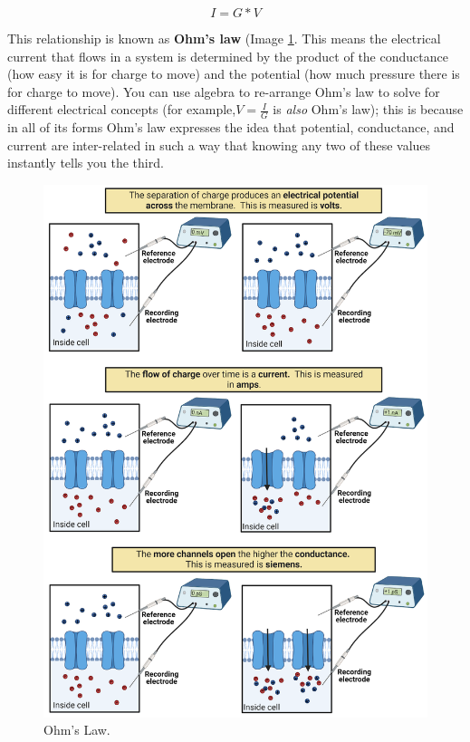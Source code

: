 \documentclass[
]{book}
\begin{document}
\[I = G * V\]

This relationship is known as \textbf{Ohm's law} (Image \ref{fig:ch02-ohms-law}. This means the electrical current that flows in a system is determined by the product of the conductance (how easy it is for charge to move) and the potential (how much pressure there is for charge to move). You can use algebra to re-arrange Ohm's law to solve for different electrical concepts (for example,\(V = \frac{I}{G}\) is \emph{also} Ohm's law); this is because in all of its forms Ohm's law expresses the idea that potential, conductance, and current are inter-related in such a way that knowing any two of these values instantly tells you the third.

\begin{figure}

{\centering \includegraphics[width=0.9\linewidth]{images/ch02/02_12} 

}

\caption{Ohm's Law.}\label{fig:ch02-ohms-law}
\end{figure}
\end{document}

